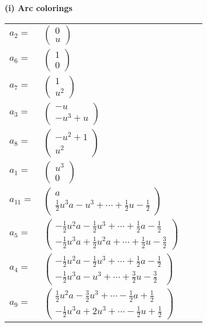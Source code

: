 \documentclass[1p]{elsarticle_modified}
\theoremstyle{definition}
\begin{document}
\flushleft \textbf{(i) Arc colorings}\\
\begin{tabular}{m{7pt} m{180pt} m{7pt} m{180pt} }
\flushright $a_{2}=$&$\begin{pmatrix}0\\u\end{pmatrix}$ \\
\flushright $a_{6}=$&$\begin{pmatrix}1\\0\end{pmatrix}$ \\
\flushright $a_{7}=$&$\begin{pmatrix}1\\u^2\end{pmatrix}$ \\
\flushright $a_{3}=$&$\begin{pmatrix}- u\\- u^3+u\end{pmatrix}$ \\
\flushright $a_{8}=$&$\begin{pmatrix}- u^2+1\\u^2\end{pmatrix}$ \\
\flushright $a_{1}=$&$\begin{pmatrix}u^3\\0\end{pmatrix}$ \\
\flushright $a_{11}=$&$\begin{pmatrix}a\\\frac{1}{2} u^3 a- u^3+\cdots+\frac{1}{2} u-\frac{1}{2}\end{pmatrix}$ \\
\flushright $a_{5}=$&$\begin{pmatrix}-\frac{1}{2} u^2 a-\frac{1}{2} u^3+\cdots+\frac{1}{2} a-\frac{1}{2}\\-\frac{1}{2} u^3 a+\frac{1}{2} u^2 a+\cdots+\frac{1}{2} u-\frac{3}{2}\end{pmatrix}$ \\
\flushright $a_{4}=$&$\begin{pmatrix}-\frac{1}{2} u^2 a-\frac{1}{2} u^3+\cdots+\frac{1}{2} a-\frac{1}{2}\\-\frac{1}{2} u^3 a- u^3+\cdots+\frac{3}{2} u-\frac{3}{2}\end{pmatrix}$ \\
\flushright $a_{9}=$&$\begin{pmatrix}\frac{1}{2} u^2 a-\frac{3}{2} u^3+\cdots-\frac{1}{2} a+\frac{1}{2}\\-\frac{1}{2} u^3 a+2 u^3+\cdots-\frac{1}{2} u+\frac{1}{2}\end{pmatrix}$ \\

\end{tabular}
\end{document}
